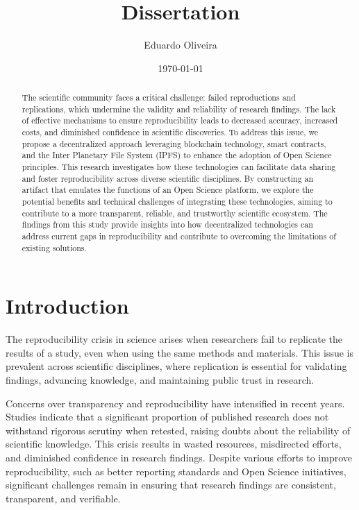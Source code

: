\documentclass{article}
\title{Dissertation}
\author{Eduardo Oliveira}
\date{\today}
\begin{document}
\maketitle

\begin{abstract}
    The scientific community faces a critical challenge: failed reproductions and replications, which undermine the validity and reliability of research findings. The lack of effective mechanisms to ensure reproducibility leads to decreased accuracy, increased costs, and diminished confidence in scientific discoveries. To address this issue, we propose a decentralized approach leveraging blockchain technology, smart contracts, and the Inter Planetary File System (IPFS) to enhance the adoption of Open Science principles. This research investigates how these technologies can facilitate data sharing and foster reproducibility across diverse scientific disciplines. By constructing an artifact that emulates the functions of an Open Science platform, we explore the potential benefits and technical challenges of integrating these technologies, aiming to contribute to a more transparent, reliable, and trustworthy scientific ecosystem. The findings from this study provide insights into how decentralized technologies can address current gaps in reproducibility and contribute to overcoming the limitations of existing solutions.
\end{abstract}


\section{Introduction}


The reproducibility crisis in science arises when researchers fail to replicate the results of a study, even when using the same methods and materials. This issue is prevalent across scientific disciplines, where replication is essential for validating findings, advancing knowledge, and maintaining public trust in research.

Concerns over transparency and reproducibility have intensified in recent years. Studies indicate that a significant proportion of published research does not withstand rigorous scrutiny when retested, raising doubts about the reliability of scientific knowledge. This crisis results in wasted resources, misdirected efforts, and diminished confidence in research findings. Despite various efforts to improve reproducibility, such as better reporting standards and Open Science initiatives, significant challenges remain in ensuring that research findings are consistent, transparent, and verifiable.
\end{document}
